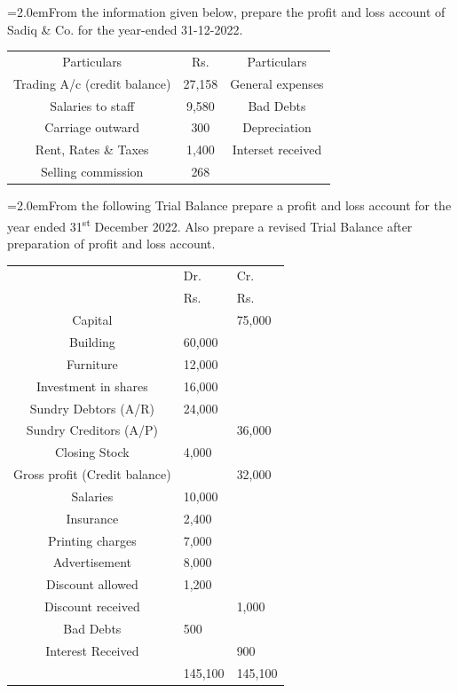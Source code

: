 \documentclass[11pt,a4paper]{article}
\newcommand{\lqn}[2]{\Needspace{6\baselineskip}\par\medskip\noindent\hangindent=2.0em\hangafter=1\makebox[2.0em][l]{\textbf{#1.}}#2\par}
\begin{document}
\lqn{84}{From the information given below, prepare the profit and loss account of Sadiq \& Co. for the year-ended 31-12-2022.\par
\par\smallskip\noindent\hspace*{1.2em}\begin{tabular}{|ccc|}
\hline
Particulars & Rs. & Particulars \\
Trading A/c (credit balance) & 27,158 & General expenses \\
Salaries to staff & 9,580 & Bad Debts \\
Carriage outward & 300 & Depreciation \\
Rent, Rates \& Taxes & 1,400 & Interset received \\
Selling commission & 268 &  \\
\hline
\end{tabular}\par\smallskip
}
\lqn{85}{From the following Trial Balance prepare a profit and loss account for the year ended 31\textsuperscript{st} December 2022. Also prepare a revised Trial Balance after preparation of profit and loss account.\par
\par\smallskip\noindent\hspace*{1.2em}\begin{tabular}{|cll|}
\hline
 & Dr. & Cr. \\
 & Rs. & Rs. \\
Capital &  & 75,000 \\
Building & 60,000 &  \\
Furniture & 12,000 &  \\
Investment in shares & 16,000 &  \\
Sundry Debtors (A/R) & 24,000 &  \\
Sundry Creditors (A/P) &  & 36,000 \\
Closing Stock & 4,000 &  \\
Gross profit (Credit balance) &  & 32,000 \\
Salaries & 10,000 &  \\
Insurance & 2,400 &  \\
Printing charges & 7,000 &  \\
Advertisement & 8,000 &  \\
Discount allowed & 1,200 &  \\
Discount received &  & 1,000 \\
Bad Debts & 500 &  \\
Interest Received &  & 900 \\
 & 145,100 & 145,100 \\
\hline
\end{tabular}\par\smallskip
}
\end{document}
